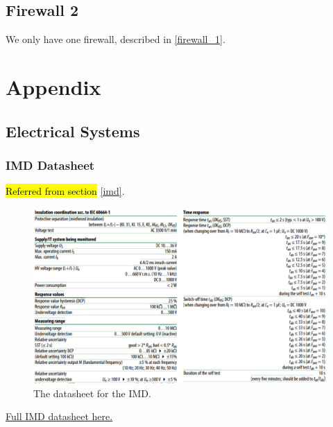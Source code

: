 \documentclass{article}
\DeclareRobustCommand{\hlr}[1]{{\sethlcolor{pink}\hl{#1}}}
\begin{document}
\subsection{Firewall 2}\label{firewall_2}
We only have one firewall, described in \ref{firewall_1}.



\section{Appendix}\label{appendix}
\setcounter{subsection}{1}
\subsection{Electrical Systems}\label{appendix_electrical_systems}
\setcounter{subsubsection}{1}
\subsubsection{IMD Datasheet}\label{IMD_datasheet}
\hlr{Referred from section} \ref{imd}.

\begin{figure} [H]
	\centering  %
	
	\includegraphics[width=\textwidth]{Formula_IMD_Datasheet.png}
	
	\caption{The datasheet for the IMD.}
	
	\label{fig:IMD_Datasheet}
\end{figure}

\href{http://www.bender-us.com/documents/IR155-10_datasheet_NAE1012821.pdf}{Full IMD datasheet here.}
\end{document}
